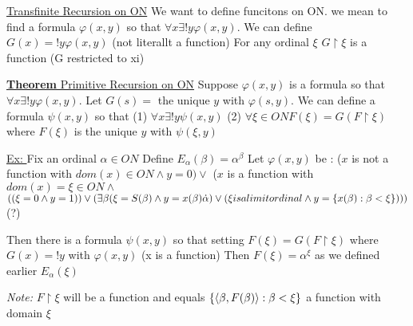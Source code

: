 \documentclass{article}
\begin{document}
    \underline{Transfinite Recursion on ON}
    We want to define funcitons on ON.
    we mean to find a formula $\varphi(x,y)$ so that $\forall x \exists! y \varphi(x,y)$.
    We can define $G(x) = !y \varphi(x,y)$ (not literallt a function)
    For any ordinal $\xi$ $G \upharpoonright \xi$ is a function (G restricted to xi)

    \underline{\textbf{Theorem} Primitive Recursion on ON}
    Suppose $\varphi(x,y)$ is a formula so that $\forall x \exists! y \varphi(x,y)$.
    Let $G(s) = $ the unique $y$ with $\varphi(s,y)$.
    We can define a formula $\psi(x,y)$ so that
    (1) $\forall x \exists! y \psi(x,y)$
    (2) $\forall \xi \in ON F(\xi) = G(F \upharpoonright \xi)$ where $F(\xi)$ is the unique $y$ with $\psi(\xi, y)$

    \underline{Ex: } Fix an ordinal $\alpha \in ON$
    Define $E_\alpha(\beta) = \alpha^\beta$
    Let $\varphi(x,y)$ be :
    ($x$ is not a function with $dom(x) \in ON \wedge y = 0 ) \vee$
    ($x$ is a function with $dom(x) = \xi \in ON \wedge$
    $((\xi = 0 \wedge y=1)) \vee (\exists \beta (\xi = S(\beta) \wedge y = x(\beta) \dot \alpha) \vee (\xi is a limit ordinal \wedge y = \{x(\beta) : \beta < \xi\})))$ (?)

    Then there is a formula $\psi(x,y)$ so that setting $F(\xi) = G(F \upharpoonright \xi)$ where $G(x) = !y$ with $\varphi(x,y)$ (x is a function)
    Then $F(\xi) = \alpha^\xi$ as we defined earlier $E_\alpha(\xi)$

    \emph{Note: } $F \upharpoonright \xi$ will be a function and equals $\{\langle \beta ,F(\beta) \rangle : \beta < \xi\}$ a function with domain $\xi$
\end{document}
